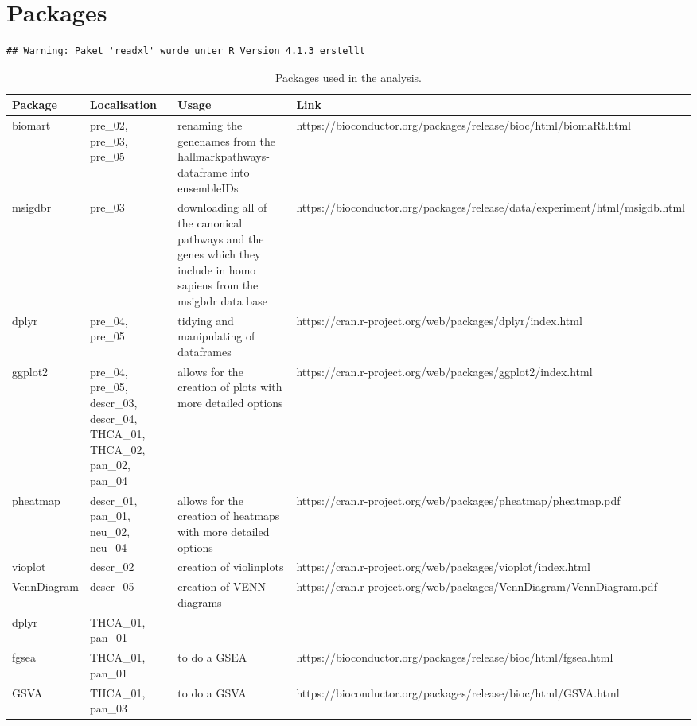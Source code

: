 \documentclass[
  parskip,
  oneside]{scrreprt}
\begin{document}
\hypertarget{packages}{%
\section{Packages}\label{packages}}

\begin{verbatim}
## Warning: Paket 'readxl' wurde unter R Version 4.1.3 erstellt
\end{verbatim}

\begin{table}[!ht]
    \centering
    \caption{Packages used in the analysis.}
    \begin{tabular}{|m{3cm}|m{3cm}|m{5cm}|m{5cm}|}
    \hline
        Package  & Localisation & Usage & Link \\ \hline
        biomart & pre\_02, pre\_03, pre\_05 & renaming the genenames from the hallmarkpathways-dataframe into ensembleIDs & https://bioconductor.org/packages/release/bioc/html/biomaRt.html \\ \hline
        msigdbr & pre\_03 & downloading all of the canonical pathways and the genes which they include in homo sapiens from the msigbdr data base & https://bioconductor.org/packages/release/data/experiment/html/msigdb.html \\ \hline
        dplyr & pre\_04, pre\_05 & tidying and manipulating of dataframes & https://cran.r-project.org/web/packages/dplyr/index.html \\ \hline
        ggplot2 & pre\_04, pre\_05, descr\_03, descr\_04, THCA\_01, THCA\_02, pan\_02, pan\_04 & allows for the creation of plots with more detailed options & https://cran.r-project.org/web/packages/ggplot2/index.html \\ \hline
        pheatmap & descr\_01, pan\_01, neu\_02, neu\_04 & allows for the creation of heatmaps with more detailed options & https://cran.r-project.org/web/packages/pheatmap/pheatmap.pdf \\ \hline
        vioplot & descr\_02 & creation of violinplots & https://cran.r-project.org/web/packages/vioplot/index.html \\ \hline
        VennDiagram & descr\_05 & creation of VENN-diagrams & https://cran.r-project.org/web/packages/VennDiagram/VennDiagram.pdf \\ \hline
        dplyr & THCA\_01, pan\_01 & ~ & ~ \\ \hline
        fgsea & THCA\_01, pan\_01 & to do a GSEA & https://bioconductor.org/packages/release/bioc/html/fgsea.html \\ \hline
        GSVA & THCA\_01, pan\_03 & to do a GSVA & https://bioconductor.org/packages/release/bioc/html/GSVA.html \\ \hline

\end{tabular}
\end{table}
\end{document}
